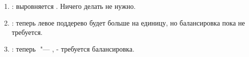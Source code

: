 \begin{enumerate}
    \item $ $: выровняется $ $. Ничего делать не нужно.
    \item $ $: теперь левое поддерево будет больше на единицу,
    но балансировка пока не требуется.
    \item $ $: теперь $ $ "--- $ $, - требуется балансировка.
\end{enumerate}